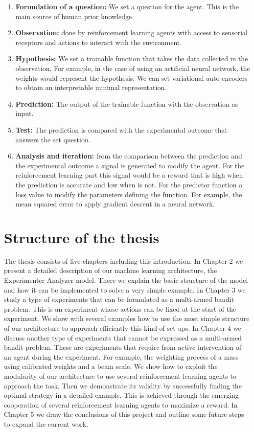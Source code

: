 \documentclass[11pt,a4paper,twoside]{report}
\newcommand{\+}{\textnormal{+} }
\theoremstyle{definition}
\numberwithin{equation}{chapter}
\begin{document}
\begin{enumerate}
  \item \textbf{Formulation of a question:} We set a question for the agent.
  This is the main source of human prior knowledge.
  \item \textbf{Observation:} done by reinforcement learning agents with access
  to sensorial receptors and actions to interact with the environment.
  \item  \textbf{Hypothesis:} We set a trainable function that takes the data
  collected in the observation. For example, in the case of using an artificial
  neural network, the weights would represent the hypothesis. We can set
  variational auto-encoders to obtain an interpretable minimal representation.
  \item \textbf{Prediction:} The output of the trainable function with the
  observation as input.
  \item \textbf{Test:} The prediction is compared with the experimental outcome
  that answers the set question.
  \item \textbf{Analysis and iteration:} from the comparison between the
  prediction and the experimental outcome a signal is generated to modify the
  agent. For the reinforcement learning part this signal would be a reward that
  is high when the prediction is accurate and low when is not. For the predictor
  function a loss value to modify the parameters defining the function. For
  example, the mean squared error to apply gradient descent in a neural network.
\end{enumerate}

\section*{Structure of the thesis}

The thesis consists of five chapters including this introduction. In Chapter 2
we present a detailed description of our machine learning architecture, the
Experimenter-Analyzer model. There we explain the basic structure of the model
and how it can be implemented to solve a very simple example. In Chapter 3 we
study a type of experiments that can be formulated as a multi-armed bandit
problem. This is an experiment whose actions can be fixed at the start of the
experiment. We show with several examples how to use the most simple structure
of our architecture to approach efficiently this kind of set-ups. In Chapter 4
we discuss another type of experiments that cannot be expressed as a multi-armed
bandit problem. These are experiments that require from active intervention of
an agent during the experiment. For example, the weighting process of a mass
using calibrated weights and a beam scale. We show how to exploit the modularity
of our architecture to use several reinforcement learning agents to approach the
task. Then we demonstrate its validity by successfully finding the optimal
strategy in a detailed example. This is achieved through the emerging
cooperation of several reinforcement learning agents to maximize a reward. In
Chapter 5 we draw the conclusions of this project and outline some future steps
to expand the current work.
\end{document}
